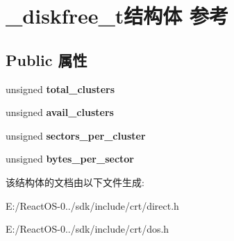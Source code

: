 \hypertarget{struct__diskfree__t}{}\section{\+\_\+diskfree\+\_\+t结构体 参考}
\label{struct__diskfree__t}
\subsection*{Public 属性}
\begin{DoxyCompactItemize}
\item 
\mbox{\label{struct__diskfree__t_a9e029ce91a308b8bf8badd7279cbea84}} 
unsigned {\bfseries total\+\_\+clusters}
\item 
\mbox{\label{struct__diskfree__t_adfc619d5442ff1a6c2c595a9c4cf7340}} 
unsigned {\bfseries avail\+\_\+clusters}
\item 
\mbox{\label{struct__diskfree__t_a39228ab09eb8d134a8b84b2ccc41bdc0}} 
unsigned {\bfseries sectors\+\_\+per\+\_\+cluster}
\item 
\mbox{\label{struct__diskfree__t_a1ffde8ea6c024735aa7c67d8760b6b81}} 
unsigned {\bfseries bytes\+\_\+per\+\_\+sector}
\end{DoxyCompactItemize}


该结构体的文档由以下文件生成\+:\begin{DoxyCompactItemize}
\item 
E\+:/\+React\+O\+S-\/0../sdk/include/crt/direct.\+h\item 
E\+:/\+React\+O\+S-\/0../sdk/include/crt/dos.\+h\end{DoxyCompactItemize}
